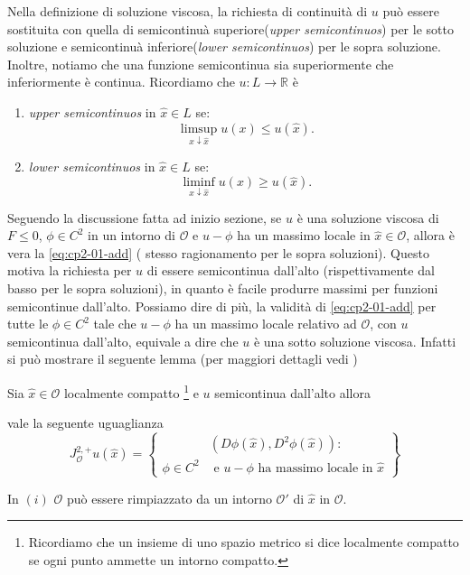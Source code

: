 \begin{osservazione}
\label{oss:cp2-01}
Nella definizione di soluzione viscosa, la richiesta di continuità di $u$ può essere sostituita con quella di semicontinuà superiore(\emph{upper semicontinuos}) per le sotto soluzione e semicontinuà inferiore(\emph{lower semicontinuos}) per le sopra soluzione. Inoltre, notiamo che una funzione semicontinua sia superiormente che inferiormente è continua. Ricordiamo che  $u:L \to\mathbb{R}$ è
\begin{enumerate}
  \item \emph{upper semicontinuos} in $\hat{x}\in L$ se:
    \[
      \limsup_{x\downarrow\hat{x}}u(x)\leq u(\hat{x}).
    \]
  \item \emph{lower semicontinuos} in $\hat{x}\in L$ se:
    \[
      \liminf_{x\downarrow\hat{x}}u(x)\geq u(\hat{x}).
    \]
\end{enumerate}  

Seguendo la discussione fatta ad inizio sezione, se $u$ è una soluzione viscosa di $F\leq 0$, $\phi\in C^2$ in un intorno di $\mathcal{O}$ e $u-\phi$ ha un massimo locale in $\hat{x}\in\mathcal{O}$, allora è vera la \eqref{eq:cp2-01-add} ( stesso ragionamento per le sopra soluzioni). Questo motiva la richiesta per $u$ di essere semicontinua dall'alto (rispettivamente dal basso per le sopra soluzioni), in quanto è facile produrre massimi per funzioni semicontinue dall'alto.
Possiamo dire di più, la validità di \eqref{eq:cp2-01-add} per tutte
le $\phi\in C^2$ tale che $u-\phi$ ha un massimo locale relativo ad
$\mathcal{O}$, con $u$ semicontinua dall'alto, equivale a dire che $u$
è una sotto soluzione viscosa.  Infatti si può mostrare il seguente
lemma (per maggiori dettagli vedi \cite[][§3]{giga:main})
\begin{lemma}
  \label{lem:cp2-01}
 Sia $\hat{x}\in\mathcal{O}$ localmente compatto%
\footnote{ Ricordiamo che un insieme di uno spazio metrico si dice localmente compatto se ogni punto ammette un intorno compatto.}
 e $u$ semicontinua dall'alto allora
\begin{enumi}
  \item  vale la seguente uguaglianza
\[
J_{\mathcal{O}}^{2,+}u(\hat{x}) = \left\{
\begin{aligned}
&(D\phi(\hat{x}),D^2\phi(\hat{x})):\\
\phi\in C^2&\text{ e $u-\phi$ ha massimo locale in $\hat{x}$}
\end{aligned}
\right\}
\]
  \item  In $(i)$ $\mathcal{O}$ può essere rimpiazzato da un intorno $\mathcal{O}'$ di $\hat{x}$ in $\mathcal{O}$.
\end{enumi}
\end{lemma}


\end{osservazione}
